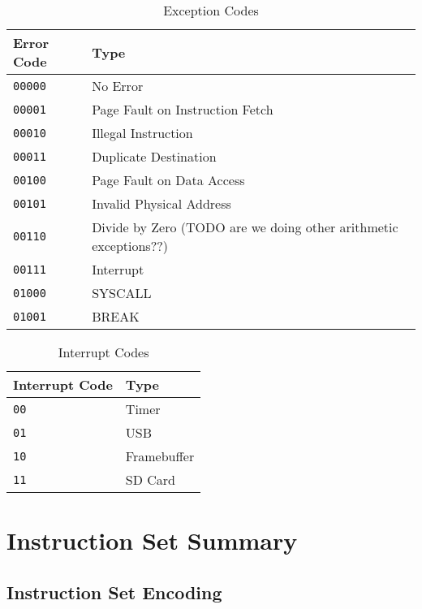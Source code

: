 \documentclass[11pt,openany]{report}
\begin{document}
\begin{table}[!h]
\begin{tabular}{l|l}
Error Code & Type\\
\hline
\texttt{00000} & No Error\\
\texttt{00001} & Page Fault on Instruction Fetch\\
\texttt{00010} & Illegal Instruction\\
\texttt{00011} & Duplicate Destination\\
\texttt{00100} & Page Fault on Data Access\\
\texttt{00101} & Invalid Physical Address\\
\texttt{00110} & Divide by Zero (TODO are we doing other arithmetic exceptions??)\\
\texttt{00111} & Interrupt\\
\texttt{01000} & SYSCALL\\
\texttt{01001} & BREAK
\end{tabular}
\caption{Exception Codes}
\label{tab:exncodes}
\end{table}

\begin{table}[!h]
\begin{tabular}{l|l}
Interrupt Code & Type\\
\hline
\texttt{00} & Timer\\
\texttt{01} & USB\\
\texttt{10} & Framebuffer\\
\texttt{11} & SD Card
\end{tabular}
\caption{Interrupt Codes}
\label{tab:intcodes}
\end{table}



\chapter{Instruction Set Summary}

\section{Instruction Set Encoding}
\end{document}
